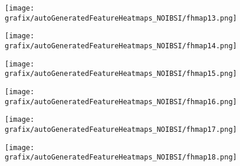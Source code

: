 \hspace{\hsp} 
\begin{subfigure}{\wid\textwidth} 
    \centering 
    \caption{\tiny \sffamily {}} 
    \vspace{\vsp} 
    \texttt{[image: grafix/autoGeneratedFeatureHeatmaps\_NOIBSI/fhmap13.png]} 
\end{subfigure} 
\hspace{\hsp} 
\begin{subfigure}{\wid\textwidth} 
    \centering 
    \caption{\tiny \sffamily {}} 
    \vspace{\vsp} 
    \texttt{[image: grafix/autoGeneratedFeatureHeatmaps\_NOIBSI/fhmap14.png]} 
\end{subfigure} 
\hspace{\hsp} 
\begin{subfigure}{\wid\textwidth} 
    \centering 
    \caption{\tiny \sffamily {}} 
    \vspace{\vsp} 
    \texttt{[image: grafix/autoGeneratedFeatureHeatmaps\_NOIBSI/fhmap15.png]} 
\end{subfigure} 
\hspace{\hsp} 
\begin{subfigure}{\wid\textwidth} 
    \centering 
    \caption{\tiny \sffamily {}} 
    \vspace{\vsp} 
    \texttt{[image: grafix/autoGeneratedFeatureHeatmaps\_NOIBSI/fhmap16.png]} 
\end{subfigure} 
\hspace{\hsp} 
\begin{subfigure}{\wid\textwidth} 
    \centering 
    \caption{\tiny \sffamily {}} 
    \vspace{\vsp} 
    \texttt{[image: grafix/autoGeneratedFeatureHeatmaps\_NOIBSI/fhmap17.png]} 
\end{subfigure} 
\hspace{\hsp} 
\begin{subfigure}{\wid\textwidth} 
    \centering 
    \caption{\tiny \sffamily {}} 
    \vspace{\vsp} 
    \texttt{[image: grafix/autoGeneratedFeatureHeatmaps\_NOIBSI/fhmap18.png]} 
\end{subfigure} 
\hspace{\hsp} 
